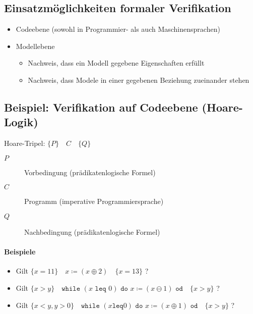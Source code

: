 \documentclass[a4paper, 11pt, accentcolor = tud3b]{tudreport}
\begin{document}
		    \subsection{Einsatzmöglichkeiten formaler Verifikation}
			    \begin{itemize}
			    	\item Codeebene (sowohl in Programmier- als auch Maschinensprachen)
				    \item Modellebene
					    \begin{itemize}
					    	\item Nachweis, dass ein Modell gegebene Eigenschaften erfüllt
					    	\item Nachweis, dass Modele in einer gegebenen Beziehung zueinander stehen
					    \end{itemize}
			    \end{itemize}
		    
		    \subsection{Beispiel: Verifikation auf Codeebene (Hoare-Logik)}
			    Hoare-Tripel: $ \{ P \} \quad C \quad \{ Q \} $
			    \begin{description}
			    	\item[$ P $] Vorbedingung (prädikatenlogische Formel)
			    	\item[$ C $] Programm (imperative Programmiersprache)
			    	\item[$ Q $] Nachbedingung (prädikatenlogische Formel)
			    \end{description}
			    
			    \paragraph{Beispiele}
				    \begin{itemize}
				    	\item Gilt $ \{ x = 11 \} \quad x \coloneqq (x \oplus 2) \quad \{ x = 13 \} $ ?
				    	\item Gilt $ \{ x > y \} \quad \texttt{while } (x \texttt{ leq } 0) \texttt{ do } x \coloneqq (x \ominus 1) \texttt{ od} \quad \{ x > y \} $ ?
				    	\item Gilt $ \{ x < y, y > 0 \} \quad \texttt{while } (x \texttt{leq} 0) \texttt{ do } x \coloneqq (x \oplus 1) \texttt{ od} \quad \{ x > y \} $ ?
				    \end{itemize}
    
\end{document}
